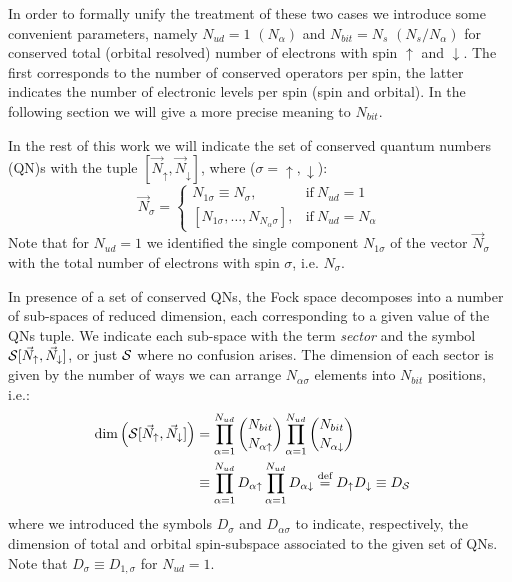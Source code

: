\documentclass[final,3p,10pt]{elsarticle}
\def\a{\alpha}       \def\b{\beta}   \def\g{\gamma}   \def\d{\delta}
\def\=={\equiv}
\def\up{\uparrow} \def\down{\downarrow} \def\dw{\downarrow}
\def\=={\equiv}
\begin{document}
%
% 
In order to formally unify the treatment of these two cases we introduce some convenient
parameters,
  namely  $N_{ud}=1$ $(N_\alpha)$ and
$N_{bit}=N_s$ $(N_s/N_\alpha)$ for conserved total (orbital resolved) number of
electrons with spin $\up$ and $\dw$.
The first corresponds to the number of conserved operators per
spin, the latter indicates the number of electronic levels per spin
(spin and orbital). In the following section we will give a more precise meaning to
$N_{bit}$.

In the rest of this work we will indicate the set of conserved quantum
numbers (QN)s with the tuple $[\vec{N}_\up,\vec{N}_\dw]$, where ($\sigma=\up,\dw$):
\begin{equation}
  \vec{N}_\sigma=
  \begin{cases}
    N_{1\sigma}\==N_\sigma, & \text{if}\ N_{ud}=1 \\
    [N_{1\sigma},\dots,N_{N_\alpha\sigma} ], & \text{if}\ N_{ud}=N_\alpha    
  \end{cases}
\end{equation}
  Note that for $N_{ud}=1$ we identified the single
  component $N_{1\sigma}$ of the vector $\vec{N}_\sigma$ with the
  total number of electrons with spin $\sigma$, i.e. $N_{\sigma}$.

In presence of a set of conserved QNs,  the Fock space decomposes into
a number of sub-spaces of reduced dimension, each
corresponding to a given value of the QNs tuple. We indicate
each sub-space with the term \textit{sector} and the symbol
$\SS[\vec{N}_\up,\vec{N}_\dw]$, or just ${\cal S}$ where no confusion
arises.
The dimension of each sector is given by the number of ways we can
arrange $N_{\a\sigma}$ elements into $N_{bit}$ positions, i.e.:
\begin{equation}
  \begin{split}
  \text{dim}\left(\SS[\vec{N}_\up,\vec{N}_\dw]\right)  & =  \prod_{\a=1}^{N_{ud}}
  \binom{N_{bit}}{N_{\a\up}}
  \prod_{\a=1}^{N_{ud}}
  \binom{N_{bit}}{N_{\a\dw}}\cr
  &\==
  \prod_{\a=1}^{N_{ud}}D_{\a\up}
  \prod_{\a=1}^{N_{ud}}D_{\a\dw}
  \stackrel{\text{def}}{=}D_{\up}D_{\dw} \== D_\SS
  \end{split}
 \label{nud_dimension}
\end{equation}
where we introduced the symbols $D_\sigma$ and $D_{\a\sigma}$  to
indicate, respectively, the dimension of total and orbital spin-subspace 
associated to the given set of QNs. Note that $D_\sigma\==D_{1,\sigma}$ for
$N_{ud}=1$. 
\end{document}

